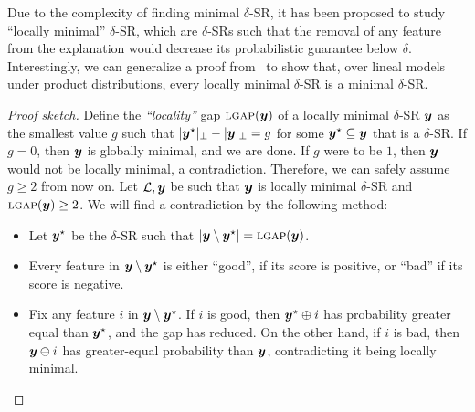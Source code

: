 Due to the complexity of finding minimal $\delta$-SR, it has been proposed to study ``locally minimal'' $\delta$-SR, which are $\delta$-SRs such that the removal of any feature from the explanation would decrease its probabilistic guarantee below $\delta$.
Interestingly, we can generalize a proof from~\cite{Arenas_Barcelo_Romero_Subercaseaux_2022} to show that, over lineal models under product distributions, every locally minimal $\delta$-SR is a minimal $\delta$-SR.

\begin{proof}[Proof sketch]
    Define the \emph{``locality''} gap $\textsc{lgap}({\bm{y}})$ of a locally minimal $\delta$-SR ${\bm{y}}$ as the smallest value $g$ such that $|{\bm{y}}^\star|_\bot - |{\bm{y}}|_\bot = g$ for some ${\bm{y}}^\star \subseteq {\bm{y}}$ that is a $\delta$-SR.
    If $g = 0$, then ${\bm{y}}$ is globally minimal, and we are done. If $g$ were to be $1$, then ${\bm{y}}$ would not be locally minimal, a contradiction. Therefore, we can safely assume $g \geq 2$ from now on.
    Let $\mathcal{L}, {\bm{y}}$ be such that ${\bm{y}}$ is locally minimal $\delta$-SR and $\textsc{lgap}({\bm{y}}) \geq 2$. We will find a contradiction by the following method:
    \begin{itemize}
        \item Let ${\bm{y}}^\star$ be the $\delta$-SR such that $| {\bm{y}} \setminus {\bm{y}}^\star | = \textsc{lgap}({\bm{y}})$.
        \item Every feature in ${\bm{y}} \setminus {\bm{y}}^\star$ is either ``good'', if its score is positive, or ``bad'' if its score is negative.
        \item Fix any feature $i$ in ${\bm{y}} \setminus {\bm{y}}^\star$. If $i$ is good, then ${\bm{y}}^\star \oplus i$ has probability greater equal than ${\bm{y}}^\star$, and the gap has reduced.
                On the other hand, if $i$ is bad, then ${\bm{y}} \ominus i$ has greater-equal probability than ${\bm{y}}$, contradicting it being locally minimal.
    \end{itemize}


\end{proof}
